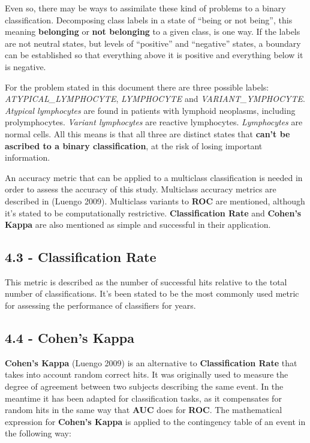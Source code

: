\documentclass[]{article}
\begin{document}
Even so, there may be ways to assimilate these kind of problems to a
binary classification. Decomposing class labels in a state of ``being or
not being'', this meaning \textbf{belonging} or \textbf{not belonging}
to a given class, is one way. If the labels are not neutral states, but
levels of ``positive'' and ``negative'' states, a boundary can be
established so that everything above it is positive and everything below
it is negative.

For the problem stated in this document there are three possible labels:
\emph{ATYPICAL\_LYMPHOCYTE}, \emph{LYMPHOCYTE} and
\emph{VARIANT\_YMPHOCYTE}. \emph{Atypical lymphocytes} are found in
patients with lymphoid neoplasms, including prolymphocytes.
\emph{Variant lymphocytes} are reactive lymphocytes. \emph{Lymphocytes}
are normal cells. All this means is that all three are distinct states
that \textbf{can't be ascribed to a binary classification}, at the risk
of losing important information.

An accuracy metric that can be applied to a multiclass classification is
needed in order to assess the accuracy of this study. Multiclass
accuracy metrics are described in (Luengo 2009). Multiclass variants to
\textbf{ROC} are mentioned, although it's stated to be computationally
restrictive. \textbf{Classification Rate} and \textbf{Cohen's Kappa} are
also mentioned as simple and successful in their application.

\subsection{4.3 - Classification Rate}\label{classification-rate}

This metric is described as the number of successful hits relative to
the total number of classifications. It's been stated to be the most
commonly used metric for assessing the performance of classifiers for
years.

\subsection{4.4 - Cohen's Kappa}\label{cohens-kappa}

\textbf{Cohen's Kappa} (Luengo 2009) is an alternative to
\textbf{Classification Rate} that takes into account random correct
hits. It was originally used to measure the degree of agreement between
two subjects describing the same event. In the meantime it has been
adapted for classification tasks, as it compensates for random hits in
the same way that \textbf{AUC} does for \textbf{ROC}. The mathematical
expression for \textbf{Cohen's Kappa} is applied to the contingency
table of an event in the following way:
\end{document}
